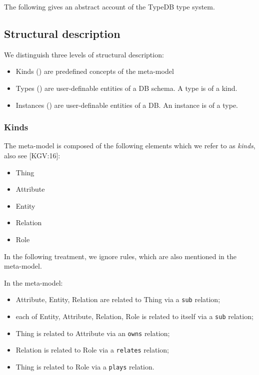 \documentclass[runningheads]{llncs}
\begin{document}
The following gives an abstract account of the TypeDB type system.

\subsection{Structural description}

We distinguish three levels of structural description:
\begin{itemize}
\item Kinds () are predefined concepts of the meta-model
\item Types () are user-definable entities of a DB
  schema. A type is of a kind.
\item Instances () are user-definable entities
  of a DB. An instance is of a type.
\end{itemize}

\subsubsection{Kinds}\label{sec:structure_kinds}

The meta-model is composed of the following elements which we refer to as
\emph{kinds}, also see [KGV:16]:
\begin{itemize}
\item Thing
\item Attribute
\item Entity
\item Relation
\item Role
\end{itemize}
In the following treatment, we ignore rules, which are also mentioned in the
meta-model.

In the meta-model:
\begin{itemize}
\item Attribute, Entity, Relation are related to Thing via a \texttt{sub}
  relation;
\item each of Entity, Attribute, Relation, Role is related to itself via a
  \texttt{sub} relation;
\item Thing is related to Attribute via an \texttt{owns} relation;
\item Relation is related to Role via a \texttt{relates} relation;
\item Thing is related to Role via a \texttt{plays} relation.
\end{itemize}
\end{document}
